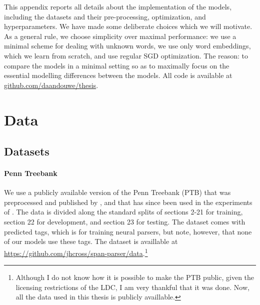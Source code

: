 % 

This appendix reports all details about the implementation of the models, including the datasets and their pre-processing, optimization, and hyperparameters. We have made some deliberate choices which we will motivate. As a general rule, we choose simplicity over maximal performance: we use a minimal scheme for dealing with unknown words, we use only word embeddings, which we learn from scratch, and use regular SGD optimization. The reason: to compare the models in a minimal setting so as to maximally focus on the essential modelling differences between the models. All code is available at \url{github.com/daandouwe/thesis}.

\section{Data}

\subsection{Datasets}

\paragraph{Penn Treebank}
We use a publicly available version of the Penn Treebank (PTB) that was preprocessed and published by \citet{cross2016span}, and that has since been used in the experiments of \citet{stern2017minimal,kitaev2018attentive}. The data is divided along the standard splits of sections 2-21 for training, section 22 for development, and section 23 for testing. The dataset comes with predicted tags, which is for training neural parsers, but note, however, that none of our models use these tags. The dataset is availlable at \url{https://github.com/jhcross/span-parser/data}.\footnote{Although I do not know how it is possible to make the PTB public, given the licensing restrictions of the LDC, I am very thankful that it was done. Now, all the data used in this thesis is publicly availlable.}

